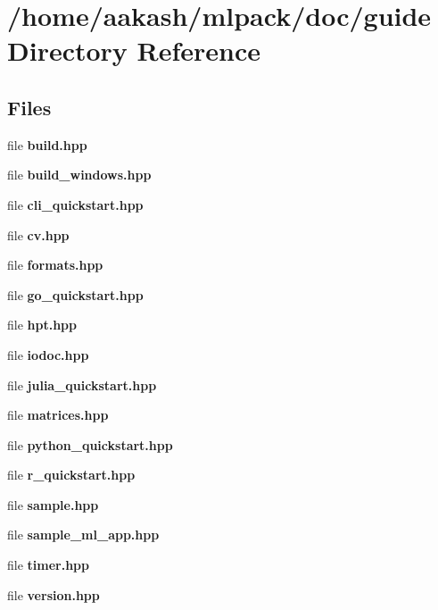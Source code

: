 \section{/home/aakash/mlpack/doc/guide Directory Reference}
\label{dir_5d70a24da6601672a505ee4a58a10c27}
\subsection*{Files}
\begin{DoxyCompactItemize}
\item 
file \textbf{ build.\+hpp}
\item 
file \textbf{ build\+\_\+windows.\+hpp}
\item 
file \textbf{ cli\+\_\+quickstart.\+hpp}
\item 
file \textbf{ cv.\+hpp}
\item 
file \textbf{ formats.\+hpp}
\item 
file \textbf{ go\+\_\+quickstart.\+hpp}
\item 
file \textbf{ hpt.\+hpp}
\item 
file \textbf{ iodoc.\+hpp}
\item 
file \textbf{ julia\+\_\+quickstart.\+hpp}
\item 
file \textbf{ matrices.\+hpp}
\item 
file \textbf{ python\+\_\+quickstart.\+hpp}
\item 
file \textbf{ r\+\_\+quickstart.\+hpp}
\item 
file \textbf{ sample.\+hpp}
\item 
file \textbf{ sample\+\_\+ml\+\_\+app.\+hpp}
\item 
file \textbf{ timer.\+hpp}
\item 
file \textbf{ version.\+hpp}
\end{DoxyCompactItemize}
